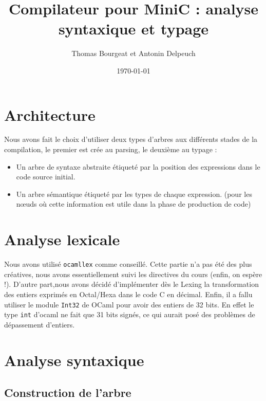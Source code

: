 \documentclass[a4paper]{article}
\begin{document}
\title{Compilateur pour MiniC : analyse syntaxique et typage}
\author{Thomas Bourgeat et Antonin Delpeuch}
\date{\today}

\maketitle

\section{Architecture}

Nous avons fait le choix d'utiliser deux types d'arbres aux différents
stades de la compilation, le premier est crée au parsing, le deuxième au
typage :
\begin{itemize}
    \item Un arbre de syntaxe abstraite étiqueté par la position des
expressions dans le code source initial.
    \item Un arbre sémantique étiqueté par les types de chaque
expression.
(pour les nœuds où cette information est utile dans la phase de
production de code)
\end{itemize}

\section{Analyse lexicale}

Nous avons utilisé \texttt{ocamllex} comme conseillé.
Cette partie n'a pas été des plus créatives, nous avons essentiellement suivi les directives du cours (enfin, on espère !).
D'autre part,nous avons décidé d'implémenter dès le Lexing la transformation des
entiers exprimés en Octal/Hexa dans le code C en décimal. Enfin, il a
fallu utiliser le module \texttt{Int32} de OCaml pour avoir des entiers de 32
bits. En effet le type \texttt{int} d'ocaml ne fait que 31 bits signés,
ce qui aurait posé des problèmes de dépassement d'entiers.

\section{Analyse syntaxique}

\subsection{Construction de l'arbre}
\end{document}
